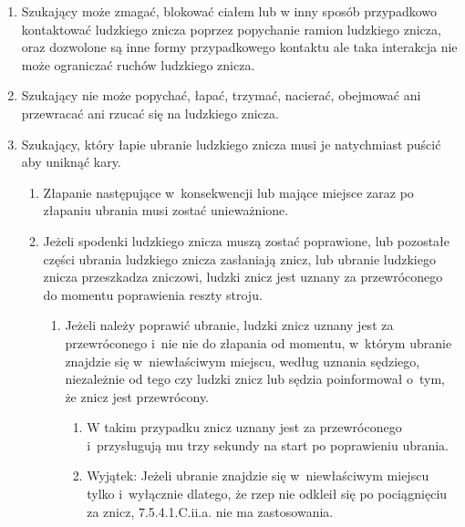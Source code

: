 \documentclass[12pt,a4paper]{article}
\begin{document}
\begin{enumerate}
	\item
	      Szukający może zmagać, blokować ciałem lub w inny sposób
	      przypadkowo kontaktować ludzkiego znicza poprzez popychanie ramion
	      ludzkiego znicza, oraz dozwolone są inne formy przypadkowego kontaktu
	      ale taka interakcja nie może ograniczać ruchów ludzkiego znicza.
	\item
	      Szukający nie może popychać, łapać, trzymać, nacierać, obejmować ani
	      przewracać ani rzucać się na ludzkiego znicza.
	\item
	      Szukający, który łapie ubranie ludzkiego znicza musi je natychmiast
	      puścić aby uniknąć kary.

	      \begin{enumerate}
		      \item
		            Złapanie następujące w~konsekwencji lub mające miejsce zaraz po
		            złapaniu ubrania musi zostać unieważnione.
		      \item
		            Jeżeli spodenki ludzkiego znicza muszą zostać poprawione, lub
		            pozostałe części ubrania ludzkiego znicza zasłaniają znicz, lub
		            ubranie ludzkiego znicza przeszkadza zniczowi, ludzki znicz jest
		            uznany za przewróconego do momentu poprawienia reszty stroju.

		            \begin{enumerate}
			            \item
			                  Jeżeli należy poprawić ubranie, ludzki znicz uznany jest za
			                  przewróconego i~nie nie do złapania od momentu, w~którym
			                  ubranie znajdzie się w~niewłaściwym miejscu, według uznania
			                  sędziego, niezależnie od tego czy ludzki znicz lub sędzia
			                  poinformował o~tym, że znicz jest przewrócony.

			                  \begin{enumerate}
				                  \item
				                        W takim przypadku znicz uznany jest za przewróconego i~przysługują mu trzy sekundy na start po poprawieniu ubrania.
				                  \item
				                        Wyjątek: Jeżeli ubranie znajdzie się w~niewłaściwym miejscu
				                        tylko i~wyłącznie dlatego, że rzep nie odkleił się po
				                        pociągnięciu za znicz, 7.5.4.1.C.ii.a. nie ma zastosowania.
			                  \end{enumerate}
		            \end{enumerate}
	      \end{enumerate}
\end{enumerate}
\end{document}
